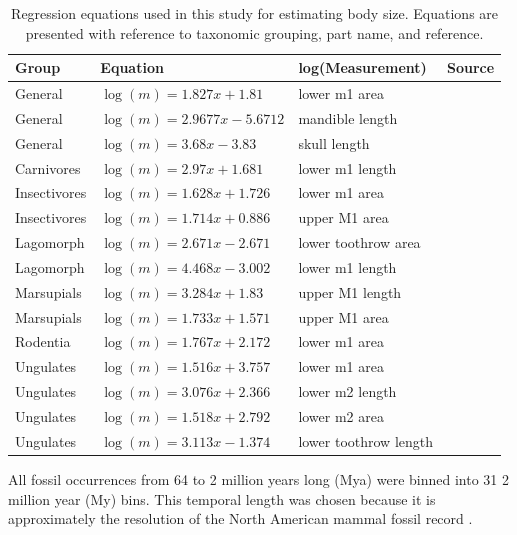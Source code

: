 \documentclass[12pt,letterpaper]{article}
\begin{document}
\begin{table}[ht]
  \centering
  \caption{Regression equations used in this study for estimating body size. Equations are presented with reference to taxonomic grouping, part name, and reference.}
  \begin{tabular}{l | l | l | l}
    Group & Equation & log(Measurement) & Source \\
    \hline
    General & \(\log(m) = 1.827x + 1.81\) & lower m1 area &  \cite{Legendre1986} \\
    General & \(\log(m) = 2.9677x - 5.6712\) & mandible length & \cite{Foster2009a} \\
    General & \(\log(m) = 3.68x - 3.83\) & skull length & \cite{Luo2001} \\
    Carnivores & \(\log(m) = 2.97x + 1.681\) & lower m1 length & \cite{VanValkenburgh1990} \\
    Insectivores & \(\log(m) = 1.628x + 1.726\) & lower m1 area & \cite{Bloch1998} \\
    Insectivores & \(\log(m) = 1.714x + 0.886\) & upper M1 area & \cite{Bloch1998} \\
    Lagomorph & \(\log(m) = 2.671x - 2.671\) & lower toothrow area & \cite{Tomiya2013} \\
    Lagomorph & \(\log(m) = 4.468x - 3.002\) & lower m1 length & \cite{Tomiya2013} \\
    Marsupials & \(\log(m) = 3.284x + 1.83\) & upper M1 length & \cite{Gordon2003} \\
    Marsupials & \(\log(m) = 1.733x + 1.571\) & upper M1 area & \cite{Gordon2003} \\
    Rodentia & \(\log(m) = 1.767x + 2.172\) & lower m1 area & \cite{Legendre1986} \\
    Ungulates & \(\log(m) = 1.516x + 3.757\) & lower m1 area & \cite{Mendoza2006} \\
    Ungulates & \(\log(m) = 3.076x + 2.366\) & lower m2 length & \cite{Mendoza2006} \\
    Ungulates & \(\log(m) = 1.518x + 2.792\) & lower m2 area & \cite{Mendoza2006} \\
    Ungulates & \(\log(m) = 3.113x - 1.374\) & lower toothrow length & \cite{Mendoza2006} \\
    \hline
  \end{tabular}
  \label{tab:mass_est}
\end{table}


All fossil occurrences from 64 to 2 million years long (Mya) were binned into 31 2 million year (My) bins. This temporal length was chosen because it is approximately the resolution of the North American mammal fossil record \citep{Alroy1996a,Alroy2000g,Marcot2014}.
\end{document}
